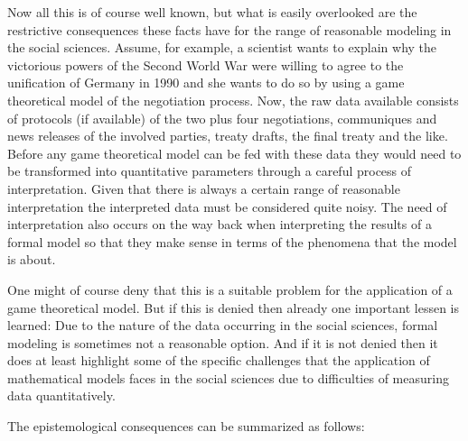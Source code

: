 \documentclass[onecollarge]{STJour}
\numberwithin{equation}{section}
\begin{document}
Now all this is of course well known, but what is easily overlooked are
the restrictive consequences these facts have for the range of reasonable
modeling in the social sciences. Assume, for example, a scientist wants
to explain why the victorious powers of the Second World War were willing
to agree to the unification of Germany in 1990 and she wants to do so by
using a game theoretical model of the negotiation process. Now, the raw
data available consists of protocols (if available) of the two plus four
negotiations, communiques and news releases of the involved parties,
treaty drafts, the final treaty and the like. Before any game theoretical
model can be fed with these data they would need to be transformed into
quantitative parameters through a careful process of interpretation.
Given that there is always a certain range of reasonable interpretation
the interpreted data must be considered quite noisy. The need of
interpretation also occurs on the way back when interpreting the results
of a formal model so that they make sense in terms of the phenomena that
the model is about.

One might of course deny that this is a suitable problem for the
application of a game theoretical model. But if this is denied then
already one important lessen is learned: Due to the nature of the data
occurring in the social sciences, formal modeling is sometimes not a
reasonable option. And if it is not denied
then it does at least highlight some of the specific challenges that the
application of mathematical models faces in the social sciences due to
difficulties of measuring data quantitatively.

The epistemological consequences can be summarized as follows: 
\end{document}
